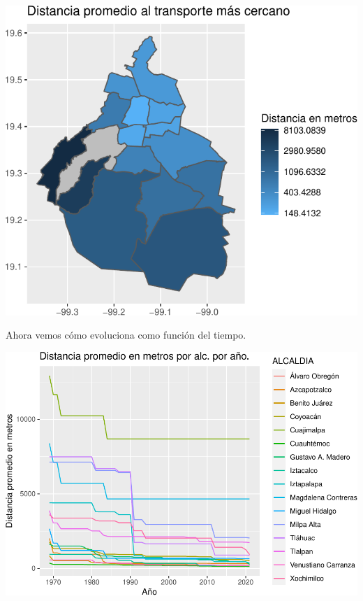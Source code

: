 \documentclass[
  spanish,
]{article}
\begin{document}
\begin{center}\includegraphics{proyecto_files/figure-latex/unnamed-chunk-12-1} \end{center}

Ahora vemos cómo evoluciona como función del tiempo.

\begin{center}\includegraphics{proyecto_files/figure-latex/unnamed-chunk-13-1} \end{center}
\end{document}
